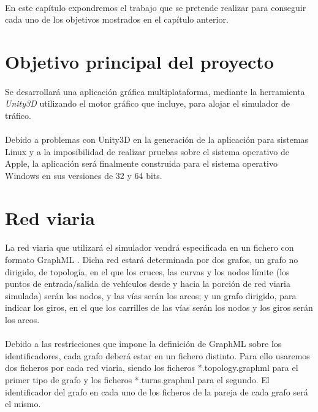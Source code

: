 	\paragraph{}
	En este capítulo expondremos el trabajo que se pretende realizar para conseguir cada uno de los objetivos mostrados en el capítulo anterior.
	
\section{Objetivo principal del proyecto}

	\paragraph{}
	Se desarrollará una aplicación gráfica multiplataforma, mediante la herramienta \emph{Unity3D} utilizando el motor gráfico que incluye, para alojar el simulador de tráfico.
	
	\paragraph{}
	Debido a problemas con Unity3D en la generación de la aplicación para sistemas Linux y a la imposibilidad de realizar pruebas sobre el sistema operativo de Apple, la aplicación será finalmente construida para el sistema operativo Windows en sus versiones de 32 y 64 bits.

\section{Red viaria}

	\paragraph{}
	La red viaria que utilizará el simulador vendrá especificada en un fichero con formato GraphML \cite{GraphML_man}. Dicha red estará determinada por dos grafos, un grafo no dirigido, de topología, en el que los cruces, las curvas y los nodos límite (los puntos de entrada/salida de vehículos desde y hacia la porción de red viaria simulada) serán los nodos, y las vías serán los arcos; y un grafo dirigido, para indicar los giros, en el que los carrilles de las vías serán los nodos y los giros serán los arcos.
	
	\paragraph{}	
	Debido a las restricciones que impone la definición de GraphML sobre los identificadores, cada grafo deberá estar en un fichero distinto. Para ello usaremos dos ficheros por cada red viaria, siendo los ficheros *.topology.graphml para el primer tipo de grafo y los ficheros *.turns.graphml para el segundo. El identificador del grafo en cada uno de los ficheros de la pareja de cada grafo será el mismo.
	
